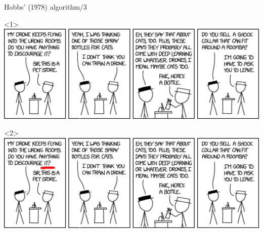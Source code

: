 \documentclass[dvipsnames, 10pt, compress]{beamer}
\begin{document}
\begin{frame}{Hobbs' (1978) algorithm/3}

\begin{onlyenv}<1>
\includegraphics[width=\textwidth]{graphics/drone-training-2x.png}
\end{onlyenv}
\begin{onlyenv}<2>
\includegraphics[width=\textwidth]{graphics/drone-training-2x-2.png}
\end{onlyenv}


\end{frame}
\end{document}
